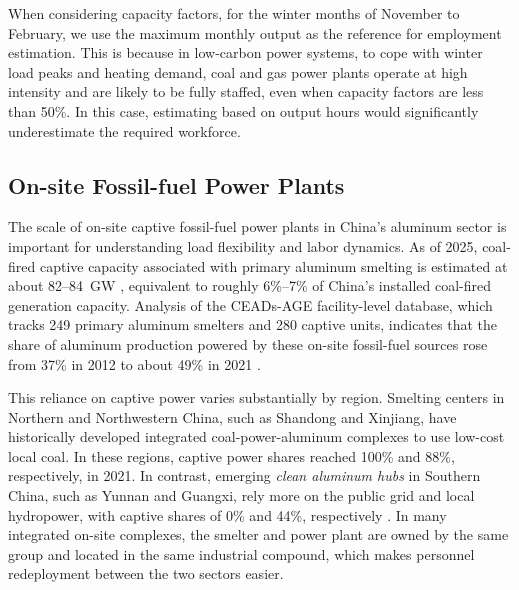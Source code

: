 \documentclass[preprint,12pt]{elsarticle}
\begin{document}
When considering capacity factors, for the winter months of November to February, we use the maximum monthly output as the reference for employment estimation. This is because in low-carbon power systems, to cope with winter load peaks and heating demand, coal and gas power plants operate at high intensity and are likely to be fully staffed, even when capacity factors are less than 50\%. In this case, estimating based on output hours would significantly underestimate the required workforce.

\subsection{On-site Fossil-fuel Power Plants}\label{on_site_generation}


The scale of on-site captive fossil-fuel power plants in China's aluminum sector is important for understanding load flexibility and labor dynamics. As of 2025, coal-fired captive capacity associated with primary aluminum smelting is estimated at about 82--84~GW \citep{ember_aluminium_coal_2025, transitionasia_aluminium_2025}, equivalent to roughly 6\%--7\% of China's installed coal-fired generation capacity. Analysis of the CEADs-AGE facility-level database, which tracks 249 primary aluminum smelters and 280 captive units, indicates that the share of aluminum production powered by these on-site fossil-fuel sources rose from 37\% in 2012 to about 49\% in 2021 \citep{tan_different_2025}.

This reliance on captive power varies substantially by region. Smelting centers in Northern and Northwestern China, such as Shandong and Xinjiang, have historically developed integrated coal-power-aluminum complexes to use low-cost local coal. In these regions, captive power shares reached 100\% and 88\%, respectively, in 2021. In contrast, emerging \textit{clean aluminum hubs} in Southern China, such as Yunnan and Guangxi, rely more on the public grid and local hydropower, with captive shares of 0\% and 44\%, respectively \citep{tan_different_2025}. In many integrated on-site complexes, the smelter and power plant are owned by the same group and located in the same industrial compound, which makes personnel redeployment between the two sectors easier.


\newpage
\end{document}
